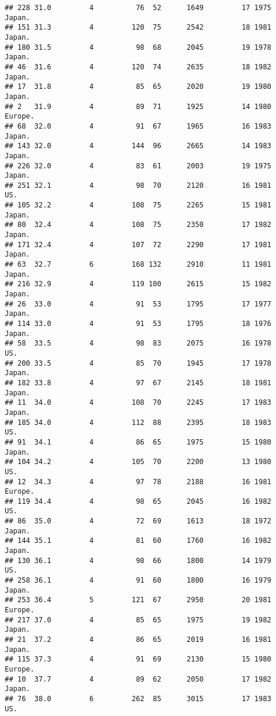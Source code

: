 \documentclass[11pt,]{article}
\begin{document}
\begin{verbatim}
## 228 31.0         4          76  52      1649         17 1975   Japan.
## 151 31.3         4         120  75      2542         18 1981   Japan.
## 180 31.5         4          98  68      2045         19 1978   Japan.
## 46  31.6         4         120  74      2635         18 1982   Japan.
## 17  31.8         4          85  65      2020         19 1980   Japan.
## 2   31.9         4          89  71      1925         14 1980  Europe.
## 68  32.0         4          91  67      1965         16 1983   Japan.
## 143 32.0         4         144  96      2665         14 1983   Japan.
## 226 32.0         4          83  61      2003         19 1975   Japan.
## 251 32.1         4          98  70      2120         16 1981      US.
## 105 32.2         4         108  75      2265         15 1981   Japan.
## 80  32.4         4         108  75      2350         17 1982   Japan.
## 171 32.4         4         107  72      2290         17 1981   Japan.
## 63  32.7         6         168 132      2910         11 1981   Japan.
## 216 32.9         4         119 100      2615         15 1982   Japan.
## 26  33.0         4          91  53      1795         17 1977   Japan.
## 114 33.0         4          91  53      1795         18 1976   Japan.
## 58  33.5         4          98  83      2075         16 1978      US.
## 200 33.5         4          85  70      1945         17 1978   Japan.
## 182 33.8         4          97  67      2145         18 1981   Japan.
## 11  34.0         4         108  70      2245         17 1983   Japan.
## 185 34.0         4         112  88      2395         18 1983      US.
## 91  34.1         4          86  65      1975         15 1980   Japan.
## 104 34.2         4         105  70      2200         13 1980      US.
## 12  34.3         4          97  78      2188         16 1981  Europe.
## 119 34.4         4          98  65      2045         16 1982      US.
## 86  35.0         4          72  69      1613         18 1972   Japan.
## 144 35.1         4          81  60      1760         16 1982   Japan.
## 130 36.1         4          98  66      1800         14 1979      US.
## 258 36.1         4          91  60      1800         16 1979   Japan.
## 253 36.4         5         121  67      2950         20 1981  Europe.
## 217 37.0         4          85  65      1975         19 1982   Japan.
## 21  37.2         4          86  65      2019         16 1981   Japan.
## 115 37.3         4          91  69      2130         15 1980  Europe.
## 10  37.7         4          89  62      2050         17 1982   Japan.
## 76  38.0         6         262  85      3015         17 1983      US.

\end{verbatim}
\end{document}
